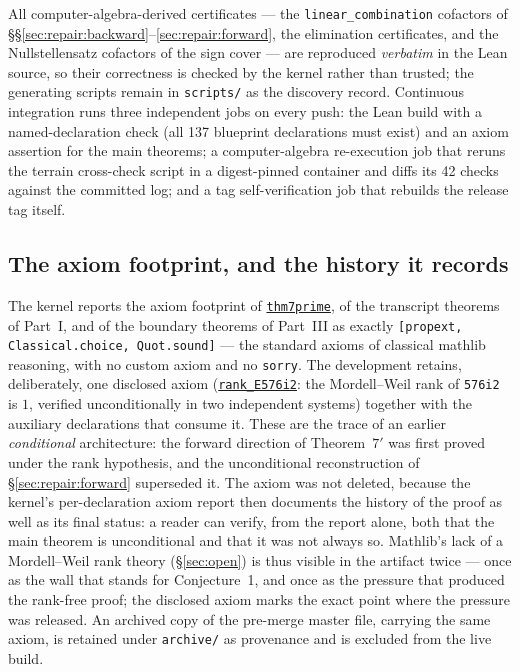 \documentclass[11pt]{amsart}
\newcommand{\repourl}{https://github.com/hirokifukui/rd-quartics-classification}
\newcommand{\repotag}{v1.1.0}
\newcommand{\leanline}[3]{\href{\repourl/blob/\repotag/#1\#L#2}{\texttt{#3}}}
\begin{document}
All computer-algebra-derived certificates --- the
\texttt{linear\_combination} cofactors of
\S\S\ref{sec:repair:backward}--\ref{sec:repair:forward}, the
elimination certificates, and the Nullstellensatz cofactors of the sign
cover --- are reproduced \emph{verbatim} in the Lean source, so their
correctness is checked by the kernel rather than trusted; the
generating scripts remain in \texttt{scripts/} as the discovery record.
Continuous integration runs three independent jobs on every push: the
Lean build with a named-declaration check (all 137 blueprint
declarations must exist) and an axiom assertion for the main theorems;
a computer-algebra re-execution job that reruns the terrain
cross-check script in a digest-pinned container and diffs its 42
checks against the committed log; and a tag self-verification job that rebuilds the
release tag itself.

\subsection{The axiom footprint, and the history it records}
\label{sec:formal:axioms}

The kernel reports the axiom footprint of
\leanline{Thm7Prime/Master.lean}{619}{thm7prime}, of the transcript
theorems of Part~I, and of the boundary theorems of Part~III as exactly
\texttt{[propext, Classical.choice, Quot.sound]} --- the standard
axioms of classical mathlib reasoning, with no custom axiom and no
\texttt{sorry}.  The development retains, deliberately, one disclosed
axiom (\leanline{Thm7Prime/Master.lean}{320}{rank\_E576i2}: the
Mordell--Weil rank of \texttt{576i2} is $1$, verified unconditionally
in two independent systems) together with the auxiliary declarations
that consume it.  These are the trace of an earlier \emph{conditional}
architecture: the forward direction of Theorem~$7'$ was first proved
under the rank hypothesis, and the unconditional reconstruction of
\S\ref{sec:repair:forward} superseded it.  The axiom was not deleted,
because the kernel's per-declaration axiom report then documents the
history of the proof as well as its final status: a reader can verify,
from the report alone, both that the main theorem is unconditional and
that it was not always so.  Mathlib's lack of a Mordell--Weil rank
theory (\S\ref{sec:open}) is thus visible in the artifact twice ---
once as the wall that stands for Conjecture~1, and once as the pressure
that produced the rank-free proof; the disclosed axiom marks the exact
point where the pressure was released.  An archived copy of the
pre-merge master file, carrying the same axiom, is retained under
\texttt{archive/} as provenance and is excluded from the live build.
\end{document}
